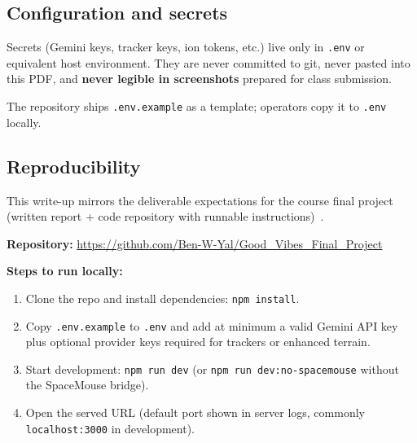 \subsection{Configuration and secrets}

Secrets (Gemini keys, tracker keys, ion tokens, etc.) live only in \texttt{.env} or equivalent host environment.
They are never committed to git, never pasted into this PDF, and \textbf{never legible in screenshots} prepared for class submission.

The repository ships \texttt{.env.example} as a template; operators copy it to \texttt{.env} locally.

\subsection{Reproducibility}

This write-up mirrors the deliverable expectations for the course final project (written report + code repository with runnable instructions)~\cite{course-req}.

\textbf{Repository:} \url{https://github.com/Ben-W-Yal/Good_Vibes_Final_Project}

\textbf{Steps to run locally:}
\begin{enumerate}[leftmargin=*]
  \item Clone the repo and install dependencies: \texttt{npm install}.
  \item Copy \texttt{.env.example} to \texttt{.env} and add at minimum a valid Gemini API key plus optional provider keys required for trackers or enhanced terrain.
  \item Start development: \texttt{npm run dev} (or \texttt{npm run dev:no-spacemouse} without the SpaceMouse bridge).
  \item Open the served URL (default port shown in server logs, commonly \texttt{localhost:3000} in development).
\end{enumerate}
